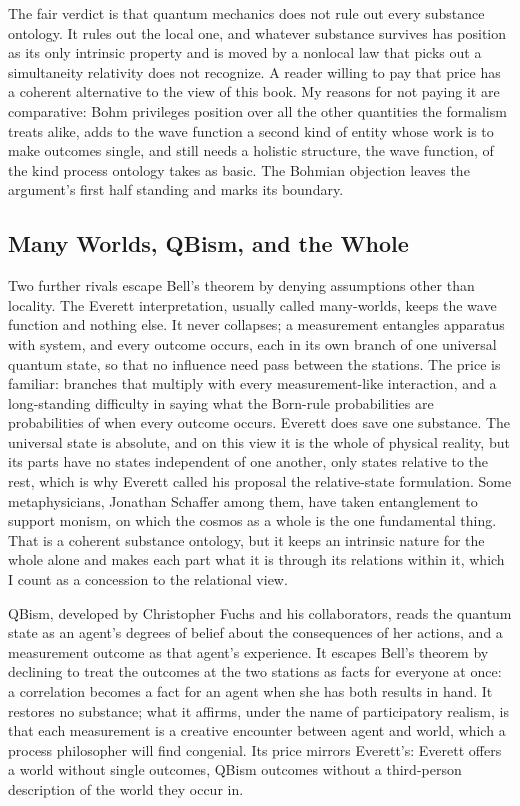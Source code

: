 The fair verdict is that quantum mechanics does not rule out every substance
ontology.
It rules out the local one, and whatever substance survives has position as its
only intrinsic property and is moved by a nonlocal law that picks out a
simultaneity relativity does not recognize.
A reader willing to pay that price has a coherent alternative to the view of this
book.
My reasons for not paying it are comparative: Bohm privileges position over all
the other quantities the formalism treats alike, adds to the wave function a
second kind of entity whose work is to make outcomes single, and still needs a
holistic structure, the wave function, of the kind process ontology takes as
basic.
The Bohmian objection leaves the argument's first half standing and marks its
boundary.

\subsection*{Many Worlds, QBism, and the Whole}

Two further rivals escape Bell's theorem by denying assumptions other than
locality.
The Everett interpretation, usually called many-worlds, keeps the wave function
and nothing else.
It never collapses; a measurement entangles apparatus with system, and every
outcome occurs, each in its own branch of one universal quantum state, so that no
influence need pass between the stations.
The price is familiar: branches that multiply with every measurement-like
interaction, and a long-standing difficulty in saying what the Born-rule
probabilities are probabilities of when every outcome occurs.
Everett does save one substance.
The universal state is absolute, and on this view it is the whole of physical
reality, but its parts have no states independent of one another, only states
relative to the rest, which is why Everett called his proposal the relative-state
formulation.
Some metaphysicians, Jonathan Schaffer among them, have taken entanglement to
support monism, on which the cosmos as a whole is the one fundamental thing.
That is a coherent substance ontology, but it keeps an intrinsic nature for the
whole alone and makes each part what it is through its relations within it,
which I count as a concession to the relational view.

QBism, developed by Christopher Fuchs and his collaborators, reads the quantum
state as an agent's degrees of belief about the consequences of her actions, and
a measurement outcome as that agent's experience.
It escapes Bell's theorem by declining to treat the outcomes at the two stations
as facts for everyone at once: a correlation becomes a fact for an agent when she
has both results in hand.
It restores no substance; what it affirms, under the name of participatory
realism, is that each measurement is a creative encounter between agent and
world, which a process philosopher will find congenial.
Its price mirrors Everett's: Everett offers a world without single outcomes,
QBism outcomes without a third-person description of the world they occur in.

